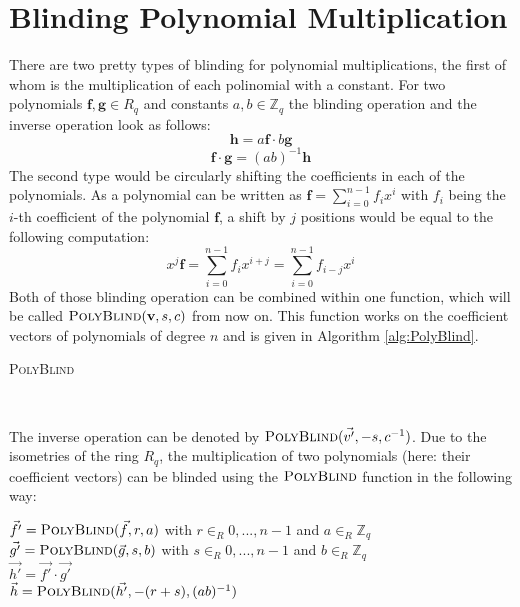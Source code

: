 \section{Blinding Polynomial Multiplication}
There are two pretty types of blinding for polynomial multiplications, the first of whom is the multiplication of each polinomial with a constant. For two polynomials \(\textbf{f},\textbf{g} \in R_q\) and constants \(a,b \in \mathbb{Z}_q\) the blinding operation and the inverse operation look as follows:
\begin{equation}
	\textbf{h} = a \textbf{f} \cdot b \textbf{g}
\end{equation}
\begin{equation}
	\textbf{f} \cdot \textbf{g} = (ab)^{-1} \textbf{h}
\end{equation}
The second type would be circularly shifting the coefficients in each of the polynomials. As a polynomial can be written as \(\textbf{f} = \sum_{i=0}^{n-1} f_i x^i\) with \(f_i\) being the \(i\)-th coefficient of the polynomial \(\textbf{f}\), a shift by \(j\) positions would be equal to the following computation:
\begin{equation}
	x^j \textbf{f} = \sum_{i=0}^{n-1} f_i x^{i+j} = \sum_{i=0}^{n-1} f_{i-j} x^i
\end{equation}
Both of those blinding operation can be combined within one function, which will be called \(\textsc{PolyBlind}(\textbf{v},s,c)\) from now on. This function works on the coefficient vectors of polynomials of degree \(n\) and is given in Algorithm \ref{alg:PolyBlind}.\newline
\begin{algorithm}
    \caption{\textsc{PolyBlind}}
    \label{alg:PolyBlind}
    \begin{algorithmic}[1]
        \EndFor
        \EndFor\\
    \end{algorithmic}
\end{algorithm}
The inverse operation can be denoted by \(\textsc{PolyBlind}(\vec{v'},-s,c^{-1})\). Due to the isometries of the ring \(R_q\), the multiplication of two polynomials (here: their coefficient vectors) can be blinded using the \(\textsc{PolyBlind}\) function in the following way:
\begin{center}
	\(\vec{f'} = \textsc{PolyBlind}(\vec{f},r,a)\) with \(r \in_R {0,...,n-1}\) and \(a \in_R \mathbb{Z}_q\)\\
	\(\vec{g'} = \textsc{PolyBlind}(\vec{g},s,b)\) with \(s \in_R {0,...,n-1}\) and \(b \in_R \mathbb{Z}_q\)\\
	\(\vec{h'} = \vec{f'} \cdot \vec{g'}\)\\
	\(\vec{h} = \textsc{PolyBlind}(\vec{h'},-(r+s),(ab)^{-1})\)
\end{center}

